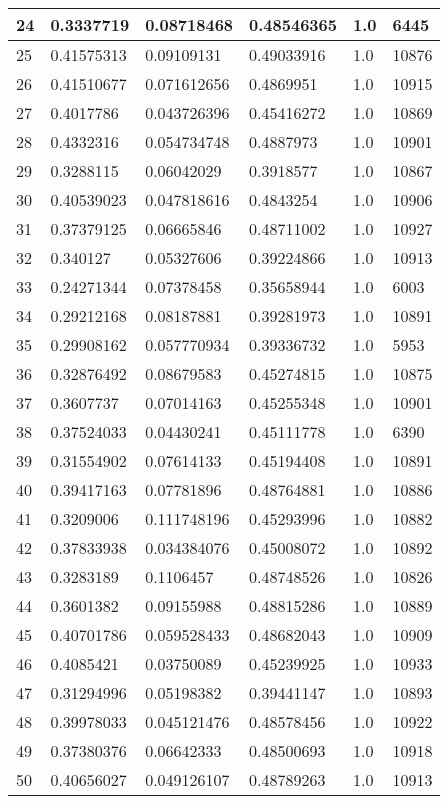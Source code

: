 \begin{longtable}{|l|l|l|l|l|l|}
24 & 0.3337719 & 0.08718468 & 0.48546365 & 1.0 & 6445 \\ \hline 
25 & 0.41575313 & 0.09109131 & 0.49033916 & 1.0 & 10876 \\ \hline 
26 & 0.41510677 & 0.071612656 & 0.4869951 & 1.0 & 10915 \\ \hline 
27 & 0.4017786 & 0.043726396 & 0.45416272 & 1.0 & 10869 \\ \hline 
28 & 0.4332316 & 0.054734748 & 0.4887973 & 1.0 & 10901 \\ \hline 
29 & 0.3288115 & 0.06042029 & 0.3918577 & 1.0 & 10867 \\ \hline 
30 & 0.40539023 & 0.047818616 & 0.4843254 & 1.0 & 10906 \\ \hline 
31 & 0.37379125 & 0.06665846 & 0.48711002 & 1.0 & 10927 \\ \hline 
32 & 0.340127 & 0.05327606 & 0.39224866 & 1.0 & 10913 \\ \hline 
33 & 0.24271344 & 0.07378458 & 0.35658944 & 1.0 & 6003 \\ \hline 
34 & 0.29212168 & 0.08187881 & 0.39281973 & 1.0 & 10891 \\ \hline 
35 & 0.29908162 & 0.057770934 & 0.39336732 & 1.0 & 5953 \\ \hline 
36 & 0.32876492 & 0.08679583 & 0.45274815 & 1.0 & 10875 \\ \hline 
37 & 0.3607737 & 0.07014163 & 0.45255348 & 1.0 & 10901 \\ \hline 
38 & 0.37524033 & 0.04430241 & 0.45111778 & 1.0 & 6390 \\ \hline 
39 & 0.31554902 & 0.07614133 & 0.45194408 & 1.0 & 10891 \\ \hline 
40 & 0.39417163 & 0.07781896 & 0.48764881 & 1.0 & 10886 \\ \hline 
41 & 0.3209006 & 0.111748196 & 0.45293996 & 1.0 & 10882 \\ \hline 
42 & 0.37833938 & 0.034384076 & 0.45008072 & 1.0 & 10892 \\ \hline 
43 & 0.3283189 & 0.1106457 & 0.48748526 & 1.0 & 10826 \\ \hline 
44 & 0.3601382 & 0.09155988 & 0.48815286 & 1.0 & 10889 \\ \hline 
45 & 0.40701786 & 0.059528433 & 0.48682043 & 1.0 & 10909 \\ \hline 
46 & 0.4085421 & 0.03750089 & 0.45239925 & 1.0 & 10933 \\ \hline 
47 & 0.31294996 & 0.05198382 & 0.39441147 & 1.0 & 10893 \\ \hline 
48 & 0.39978033 & 0.045121476 & 0.48578456 & 1.0 & 10922 \\ \hline 
49 & 0.37380376 & 0.06642333 & 0.48500693 & 1.0 & 10918 \\ \hline 
50 & 0.40656027 & 0.049126107 & 0.48789263 & 1.0 & 10913 \\ \hline 
\end{longtable}
